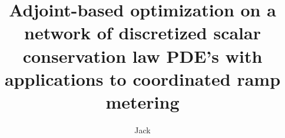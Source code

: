 \documentclass[english]{article}
\theoremstyle{plain}
\theoremstyle{definition}
\theoremstyle{remark}
\theoremstyle{remark}
\theoremstyle{plain}
\begin{document}
\title{Adjoint-based optimization on a network of discretized scalar conservation
law PDE's with applications to coordinated ramp metering}


\author{Jack}
\maketitle





\end{document}
